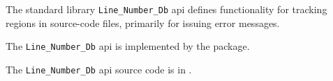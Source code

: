 
The standard library {\tt Line\_Number\_Db} api defines functionality for tracking 
regions in source-code files, primarily for issuing error messages.

The {\tt Line\_Number\_Db} api is implemented by the  package.

The {\tt Line\_Number\_Db} api source code is in .






